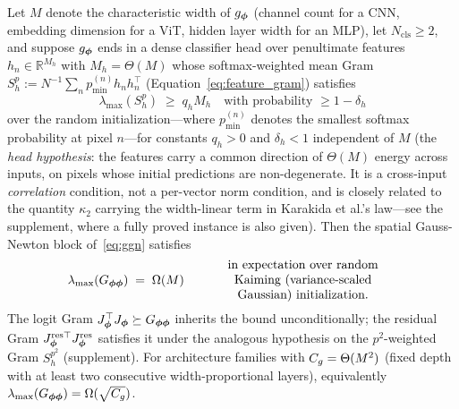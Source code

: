 \begin{lemma}
\label{lem:phi_scaling}
Let $M$ denote the characteristic width of $g_{\boldsymbol{\phi}}$ (channel count
for a CNN, embedding dimension for a ViT, hidden layer width for an
MLP), let $N_{\mathrm{cls}} \geq 2$, and suppose $g_{\boldsymbol{\phi}}$ ends in a dense
classifier head over penultimate features
$h_n \in \mathbb{R}^{M_h}$ with $M_h = \Theta(M)$ whose
softmax-weighted mean Gram
$S_h^{p} := N^{-1}\sum_n p^{(n)}_{\min} h_n h_n^\top$
(Equation~\eqref{eq:feature_gram}) satisfies
\[
    \lambda_{\max}(S_h^{p}) \;\geq\; q_h M_h
    \quad\text{with probability } \geq 1 - \delta_h
\]
over the random initialization---where $p^{(n)}_{\min}$ denotes the
smallest softmax probability at pixel $n$---for constants $q_h > 0$
and $\delta_h < 1$ independent of $M$ (the \emph{head hypothesis}:
the features carry a common direction of $\Theta(M)$ energy across
inputs, on pixels whose initial predictions are non-degenerate. It
is a cross-input \emph{correlation} condition, not a per-vector norm
condition, and is closely related to the quantity $\kappa_2$
carrying the width-linear term in Karakida et al.'s
law---see the supplement, where a fully proved instance is also
given). Then the spatial Gauss-Newton
block of~\eqref{eq:ggn} satisfies
\[
    \lambda_{\max}(G_{\phip\phip})
    \;=\; \Omega(M)
    \qquad \parbox{15em}{\centering in expectation over random Kaiming
    (variance-scaled Gaussian) initialization.}
\]
The logit Gram $J_{\boldsymbol{\phi}}^\top J_{\boldsymbol{\phi}} \succeq G_{{\boldsymbol{\phi}}{\boldsymbol{\phi}}}$
inherits the bound unconditionally; the residual Gram
$J_{\boldsymbol{\phi}}^{\mathrm{res}\top} J_{\boldsymbol{\phi}}^{\mathrm{res}}$ satisfies it
under the analogous hypothesis on the $p^2$-weighted Gram
$S_h^{p^2}$ (supplement). For architecture families with
$C_g = \Theta(M^2)$ (fixed depth with at least two consecutive
width-proportional layers), equivalently
$\lambda_{\max}(G_{{\boldsymbol{\phi}}{\boldsymbol{\phi}}}) = \Omega(\sqrt{C_g})$.
\end{lemma}

